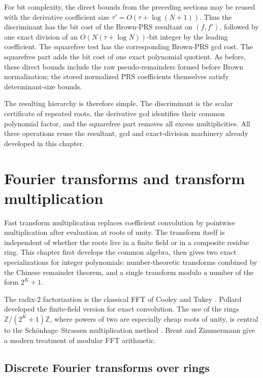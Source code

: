 \documentclass[11pt]{book}
\theoremstyle{definition}
\newcommand{\ZZ}{\mathbb Z}
\begin{document}
For bit complexity, the direct bounds from the preceding sections may be
reused with the derivative coefficient size
$\tau'=O(\tau+\log(N+1))$.  Thus the discriminant has the bit cost of the
Brown-PRS resultant on $(f,f')$, followed by one exact division of an
$O(N(\tau+\log N))$-bit integer by the leading coefficient.  The squarefree
test has the corresponding Brown-PRS gcd cost.  The squarefree part adds the
bit cost of one exact polynomial quotient.  As before, these direct bounds
include the raw pseudo-remainders formed before Brown normalization; the
stored normalized PRS coefficients themselves satisfy determinant-size
bounds.

The resulting hierarchy is therefore simple.  The discriminant is the scalar
certificate of repeated roots, the derivative gcd identifies their common
polynomial factor, and the squarefree part removes all excess multiplicities.
All three operations reuse the resultant, gcd and exact-division machinery
already developed in this chapter.


\chapter{Fourier transforms and transform multiplication}
\label{chap:fft}

Fast transform multiplication replaces coefficient convolution by pointwise
multiplication after evaluation at roots of unity.  The transform itself is
independent of whether the roots live in a finite field or in a composite
residue ring.  This chapter first develops the common algebra, then gives two
exact specializations for integer polynomials: number-theoretic transforms
combined by the Chinese remainder theorem, and a single transform modulo a
number of the form $2^K+1$.

The radix-$2$ factorization is the classical FFT of Cooley and Tukey
\cite{CooleyTukey1965}.  Pollard \cite{Pollard1971} developed the finite-field
version for exact convolution.  The use of the rings $\ZZ/(2^K+1)\ZZ$, where
powers of two are especially cheap roots of unity, is central to the
Sch\"onhage--Strassen multiplication method \cite{SchonhageStrassen1971}.
Brent and Zimmermann \cite{BrentZimmermann2010} give a modern treatment of
modular FFT arithmetic.

\section{Discrete Fourier transforms over rings}
\end{document}
